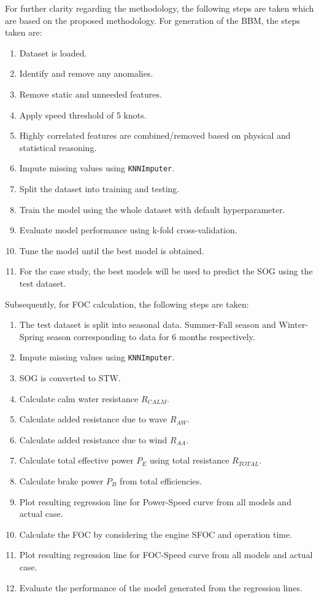 \documentclass[]{interact}
\theoremstyle{plain}%
\theoremstyle{definition}
\theoremstyle{remark}
\begin{document}
For further clarity regarding the methodology, the following steps are taken which are based on the proposed methodology. For generation of the BBM, the steps taken are: 

\begin{enumerate}
    \item Dataset is loaded.
    \item Identify and remove any anomalies.
    \item Remove static and unneeded features.
    \item Apply speed threshold of 5 knots.
    \item Highly correlated features are combined/removed based on physical and statistical reasoning.
    \item Impute missing values using {\tt KNNImputer}.
    \item Split the dataset into training and testing.
    \item Train the model using the whole dataset with default hyperparameter.
    \item Evaluate model performance using k-fold cross-validation.
    \item Tune the model until the best model is obtained.
    \item For the case study, the best models will be used to predict the SOG using the test dataset.
\end{enumerate}

Subsequently, for FOC calculation, the following steps are taken:

\begin{enumerate}
    \item The test dataset is split into seasonal data. Summer-Fall season and Winter-Spring season corresponding to data for 6 months respectively.
    \item Impute missing values using {\tt KNNImputer}.
    \item SOG is converted to STW.
    \item Calculate calm water resistance $R_{CALM}$.
    \item Calculate added resistance due to wave $R_{AW}$.
    \item Calculate added resistance due to wind $R_{AA}$.
    \item Calculate total effective power $P_E$ using total resistance $R_{TOTAL}$.
    \item Calculate brake power $P_B$ from total efficiencies.
    \item Plot resulting regression line for Power-Speed curve from all models and actual case. 
    \item Calculate the FOC by considering the engine SFOC and operation time.
    \item Plot resulting regression line for FOC-Speed curve from all models and actual case.
    \item Evaluate the performance of the model generated from the regression lines.
\end{enumerate}
\end{document}
